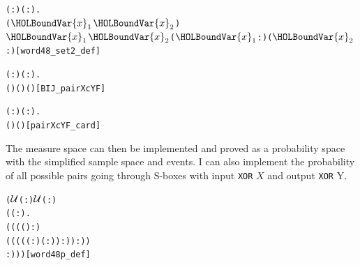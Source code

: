 \documentclass{article}
\begin{document}
\begin{alltt}
\HOLTokenTurnstile{} \HOLSymConst{\HOLTokenForall{}}( :) ( :).
        \HOLSymConst{=}
     \HOLTokenLeftbrace{}(\ensuremath{\HOLBoundVar{x}\sb{\mathrm{1}}}\HOLSymConst{,}\ensuremath{\HOLBoundVar{x}\sb{\mathrm{2}}}) \HOLTokenBar{}
      \ensuremath{\HOLBoundVar{x}\sb{\mathrm{1}}} \HOLSymConst{\HOLTokenEor{}} \ensuremath{\HOLBoundVar{x}\sb{\mathrm{2}}} \HOLSymConst{=}   \HOLSymConst{\HOLTokenConj{}} ( \ensuremath{\HOLBoundVar{x}\sb{\mathrm{1}}} :) \HOLSymConst{\HOLTokenEor{}} ( \ensuremath{\HOLBoundVar{x}\sb{\mathrm{2}}} :) \HOLSymConst{=} \HOLTokenRightbrace{}\hfill{[word48_set2_def]}
\end{alltt}

\begin{alltt}
\HOLTokenTurnstile{} \HOLSymConst{\HOLTokenForall{}}( :) ( :).
      ( ) (  ) (  )\hfill{[BIJ_pairXcYF]}
\end{alltt}

\begin{alltt}
\HOLTokenTurnstile{} \HOLSymConst{\HOLTokenForall{}}( :) ( :).
      (  ) \HOLSymConst{=}  (  )\hfill{[pairXcYF_card]}
\end{alltt}

The measure space can then be implemented and proved as a probability space with the simplified sample space and events.
I can also implement the probability of all possible pairs going through S-boxes with input \verb|XOR| $X$ and output \verb|XOR| Y.
\begin{alltt}
\HOLTokenTurnstile{}  \HOLSymConst{=}
   (\ensuremath{{\cal{U}}}(:)\HOLSymConst{,} \ensuremath{{\cal{U}}}(:)\HOLSymConst{,}
    (\HOLTokenLambda{}( : \HOLTokenMap{} ).
         ((((\HOLSymConst{\&} ) :) \HOLSymConst{/}
           ((\HOLSymConst{\&}((( :) \HOLSymConst{\HOLTokenExp{}} ( :)) :)) :))
            :)))\hfill{[word48p_def]}
\end{alltt}
\end{document}
